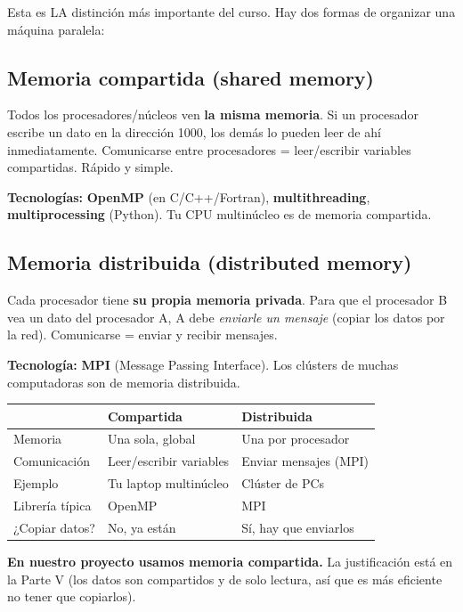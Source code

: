 \documentclass[11pt,a4paper]{article}
\newcommand{\term}[1]{\textbf{\textcolor{clave}{#1}}}
\begin{document}
Esta es LA distinción más importante del curso. Hay dos formas de organizar una
máquina paralela:

\subsection{Memoria compartida (shared memory)}
Todos los procesadores/núcleos ven \textbf{la misma memoria}. Si un procesador
escribe un dato en la dirección 1000, los demás lo pueden leer de ahí
inmediatamente. Comunicarse entre procesadores = leer/escribir variables
compartidas. Rápido y simple.

\textbf{Tecnologías:} \term{OpenMP} (en C/C++/Fortran), \term{multithreading},
\term{multiprocessing} (Python). Tu CPU multinúcleo es de memoria compartida.

\subsection{Memoria distribuida (distributed memory)}
Cada procesador tiene \textbf{su propia memoria privada}. Para que el procesador
B vea un dato del procesador A, A debe \emph{enviarle un mensaje} (copiar los
datos por la red). Comunicarse = enviar y recibir mensajes.

\textbf{Tecnología:} \term{MPI} (Message Passing Interface). Los clústers de
muchas computadoras son de memoria distribuida.

\begin{caja}[title=\textbf{Comparación rápida}]
\begin{tabular}{p{}p{}p{}}
& \textbf{Compartida} & \textbf{Distribuida} \\\midrule
Memoria & Una sola, global & Una por procesador \\
Comunicación & Leer/escribir variables & Enviar mensajes (MPI) \\
Ejemplo & Tu laptop multinúcleo & Clúster de PCs \\
Librería típica & OpenMP & MPI \\
¿Copiar datos? & No, ya están & Sí, hay que enviarlos \\
\end{tabular}
\end{caja}

\textbf{En nuestro proyecto usamos memoria compartida.} La justificación está en
la Parte V (los datos son compartidos y de solo lectura, así que es más
eficiente no tener que copiarlos).
\end{document}
